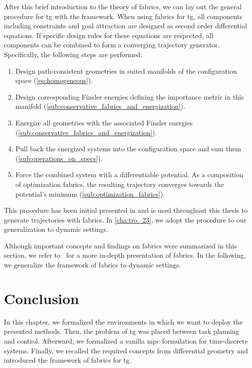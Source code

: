 After this brief introduction to the theory of \ac{fabrics},
we can lay out the general procedure for \ac{tg} with the
framework.
When using \ac{fabrics} for \ac{tg}, all
components including constraints and goal attraction are
designed as second order differential equations. If specific
design rules for these equations are respected, all
components can be combined to form a converging trajectory
generator. Specifically, the following steps are performed:
%
\begin{enumerate}
  \item Design path\hyp{}consistent geometries in suited manifolds of the configuration space
    (\cref{eq:homogeneous}).
  \item Design corresponding Finsler energies defining the importance metric in this manifold
    (\cref{sub:conservative_fabrics_and_energization}).
  \item Energize all geometries with the associated Finsler energies 
    (\cref{sub:conservative_fabrics_and_energization}).
  \item Pull back the energized systems into the configuration space and sum them 
    (\cref{sub:operations_on_specs}).
  \item Force the combined system with a differentiable potential. As a composition of optimization fabrics, 
    the resulting trajectory converges towards the potential's minimum
    (\cref{sub:optimization_fabrics}).
\end{enumerate}

This procedure has been initial presented in
\cite{Ratliff2020} and is used throughout this thesis to
generate trajectories with \ac{fabrics}. In \cref{cha:tro_23},
we adopt the procedure to our generalization to dynamic
settings.

Although important concepts and findings on \ac{fabrics} were summarized in this
section, we refer to~\cite{Ratliff2020} for a more in-depth presentation of
\ac{fabrics}. In the following, we generalize the framework of
\ac{fabrics} to dynamic settings.

\section{Conclusion}%
\label{sec:background_conclusion}

In this chapter, we formalized the environments in which we
want to deploy the presented methods. Then, the problem of
\ac{tg} was placed between task planning and control.
Afterward, we formalized a vanilla \ac{mpc} formulation for
time-discrete systems. Finally, we recalled the required
concepts from differential geometry and introduced the
framework of \ac{fabrics} for \ac{tg}.


